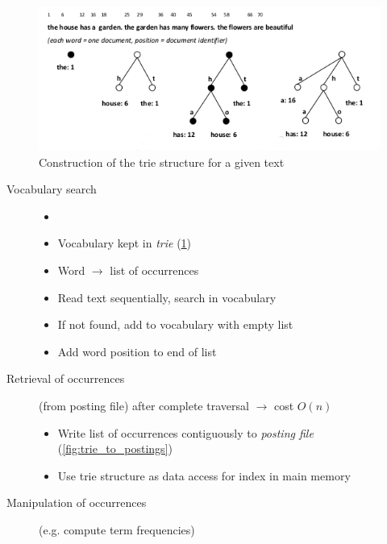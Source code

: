 \begin{figure}
  \centering
  \includegraphics[width=\linewidth]{figures/trie_vocabulary.png}
  \caption{Construction of the trie structure for a given text}
  \label{fig:trie_vocabulary}
\end{figure}

\begin{description}

  \item[Vocabulary search]
  \begin{itemize}
    \item[]
    \item Vocabulary kept in \emph{trie} (\cref{fig:trie_vocabulary})
    \item Word $\longrightarrow$ list of occurrences
    \item Read text sequentially, search in vocabulary
    \item If not found, add to vocabulary with empty list
    \item Add word position to end of list
  \end{itemize}

  \item[Retrieval of occurrences] (from posting file) after complete traversal $\rightarrow$ cost $O(n)$
  \begin{itemize}
    \item Write list of occurrences contiguously to \emph{posting file} (\cref{fig:trie_to_postings})
    \item Use trie structure as data access for index in main memory
  \end{itemize}

  \item[Manipulation of occurrences] (e.g. compute term frequencies)

\end{description}

